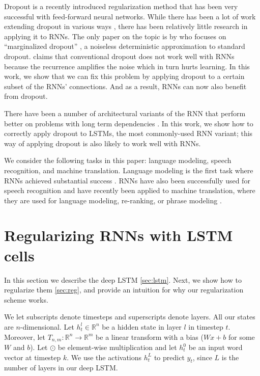 \documentclass{article}
\begin{document}
Dropout \cite{srivastava2013improving} is a recently introduced
regularization method that has been very successful with
feed-forward neural networks.   While there has been a lot of  work
extending dropout in various ways \cite{wang2013fast,wan2013regularization}, there has
been relatively little research in applying it to RNNs. The only
paper on the topic is by \cite{bayer2013fast} who focuses on
``marginalized dropout'' \citet{wang2013fast}, a
noiseless deterministic approximation to standard dropout.
\citet{bayer2013fast} claims that conventional dropout does not work well
with RNNs because the recurrence amplifies the noise which in turn hurts learning. 
In this work, we show that we can fix this problem by
applying dropout to a certain subset of the RNNs' connections.  And as a result, RNNs
can now also benefit from dropout.

There have been a number of architectural variants of the RNN that
perform better on problems with long term dependencies
\cite{hochreiter1997long, graves2009novel, cho2014learning,
  jaeger2007optimization, koutnik2014clockwork}.  In this work, we
show how to correctly apply dropout to LSTMs, the most
commonly-used RNN variant; this way of applying dropout is also likely to
work well with RNNs. 

We consider the following tasks in this paper: language modeling,
speech recognition, and machine translation.  Language modeling is the
first task where RNNs achieved substantial success
\cite{mikolov2010recurrent, mikolov2011strategies,
  pascanu2013construct}.  RNNs have also been successfully used for
speech recognition \cite{robinson1996use, graves2013speech} and have
recently been applied to machine translation, where they are 
used for language modeling, re-ranking, or phrase modeling
\cite{devlin14,kal13,cho2014learning,chow1987byblos,mikolov2013exploiting}.


\section{Regularizing RNNs with LSTM cells}

In this section we describe the deep LSTM \ref{sec:lstm}. Next, 
we show how to regularize them \ref{sec:reg}, and provide an intuition
for why our regularization scheme works.

We let subscripts denote timesteps and superscripts denote 
layers.  All our states are $n$-dimensional.  Let $h^l_t
\in \mathbb{R}^{n}$ be a hidden state in layer $l$ in timestep
$t$. Moreover, let $T_{n,m}:\mathbb{R}^{n} \rightarrow \mathbb{R}^{m}$
be a linear transform with a bias ($Wx + b$ for some $W$ and $b$).
Let $\odot$ be element-wise multiplication and let $h^0_t$ be an
input word vector at timestep $k$.  We use the activations $h^{L}_t$ to predict $y_t$,
since $L$ is the number of layers in our deep LSTM.
\end{document}
